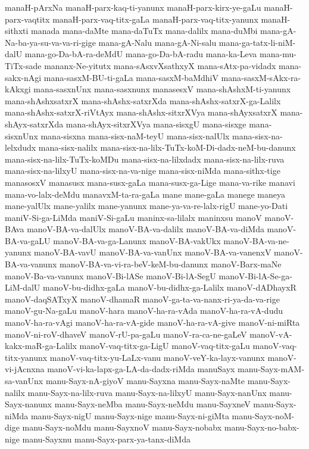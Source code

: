 {manaH-pArxNa
manaH-parx-kaq-ti-yanunx
manaH-parx-kirx-ye-gaLu
manaH-parx-vaqtitx
manaH-parx-vaq-titx-gaLa
manaH-parx-vaq-titx-yanunx
manaH-sithxti
manada
mana-daMte
mana-daTuTx
mana-dalilx
mana-duMbi
mana-gA-Na-ba-ya-su-va-va-ri-gige
mana-gA-Nalu
mana-gA-Ni-salu
mana-ga-tatx-li-niM-dalU
mana-go-Da-bA-ra-deMdU
mana-go-Da-bA-radu
mana-ka-Leva
mana-mu-TiTx-sade
mananx-Ne-yitutx
mana-sAsxvXsathxyX
mana-sAtx-pa-vidadx
mana-sakx-nAgi
mana-sasxM-BU-ti-gaLa
mana-sasxM-baMdhiV
mana-sasxM-sAkx-ra-kAkxgi
mana-sasxnUnx
mana-sasxnunx
manasesxV
mana-shAshxM-ti-yanunx
mana-shAshxsatxrX
mana-shAshx-satxrXda
mana-shAshx-satxrX-ga-Lalilx
mana-shAshx-satxrX-riVtAyx
mana-shAshx-sitxrXVya
mana-shAyxsatxrX
mana-shAyx-satxrXda
mana-shAyx-sitxrXVya
mana-sisxgU
mana-sisxge
mana-sisxnUnx
mana-sisxna
mana-sisx-naM-teyU
mana-sisx-nalUlx
mana-sisx-na-lelxdudx
mana-sisx-nalilx
mana-sisx-na-lilx-TuTx-koM-Di-dadx-neM-bu-danunx
mana-sisx-na-lilx-TuTx-koMDu
mana-sisx-na-lilxdadx
mana-sisx-na-lilx-ruva
mana-sisx-na-lilxyU
mana-sisx-na-va-nige
mana-sisx-niMda
mana-sithx-tige
manasosxV
manasusx
mana-susx-gaLa
mana-susx-ga-Lige
mana-va-rike
manavi
mana-vo-lalx-deMdu
manavxM-ta-ra-gaLa
mane
mane-gaLa
manege
maneya
mane-yalUlx
mane-yalilx
mane-yanunx
mane-ya-va-re-lalx-rigU
mane-yo-Dati
maniV-Si-ga-LiMda
maniV-Si-gaLu
maninx-sa-lilalx
maninxsu
manoV
manoV-BAva
manoV-BA-va-dalUlx
manoV-BA-va-dalilx
manoV-BA-va-diMda
manoV-BA-va-gaLU
manoV-BA-va-ga-Lanunx
manoV-BA-vakUkx
manoV-BA-va-ne-yanunx
manoV-BA-vavU
manoV-BA-va-vanUnx
manoV-BA-va-vanenxV
manoV-BA-va-vanunx
manoV-BA-va-vi-ra-beV-keM-bu-danunx
manoV-Barx-maNe
manoV-Ba-va-vanunx
manoV-Bi-lASe
manoV-Bi-lA-SegU
manoV-Bi-lA-Se-ga-LiM-dalU
manoV-bu-didhx-gaLa
manoV-bu-didhx-ga-Lalilx
manoV-dADhayxR
manoV-daqSATxyX
manoV-dhamaR
manoV-ga-ta-va-nanx-ri-ya-da-va-rige
manoV-gu-Na-gaLu
manoV-hara
manoV-ha-ra-vAda
manoV-ha-ra-vA-dudu
manoV-ha-ra-vAgi
manoV-ha-ra-vA-gide
manoV-ha-ra-vA-give
manoV-ni-miRta
manoV-ni-roV-dhaveV
manoV-rU-pa-gaLu
manoV-ra-ca-ne-gaLeV
manoV-vA-kakx-maR-ga-Lalilx
manoV-vaq-titx-ga-LigU
manoV-vaq-titx-gaLu
manoV-vaq-titx-yanunx
manoV-vaq-titx-yu-LaLx-vanu
manoV-veY-ka-layx-vanunx
manoV-vi-jAcnxna
manoV-vi-ka-lapx-ga-LA-da-dadx-riMda
manuSayx
manu-Sayx-mAM-sa-vanUnx
manu-Sayx-nA-giyoV
manu-Sayxna
manu-Sayx-naMte
manu-Sayx-nalilx
manu-Sayx-na-lilx-ruva
manu-Sayx-na-lilxyU
manu-Sayx-nanUnx
manu-Sayx-nanunx
manu-Sayx-neMba
manu-Sayx-neMdu
manu-SayxneV
manu-Sayx-niMda
manu-Sayx-nigU
manu-Sayx-nige
manu-Sayx-ni-giMta
manu-Sayx-noM-dige
manu-Sayx-noMdu
manu-SayxnoV
manu-Sayx-nobabx
manu-Sayx-no-babx-nige
manu-Sayxnu
manu-Sayx-parx-ya-tanx-diMda
}
